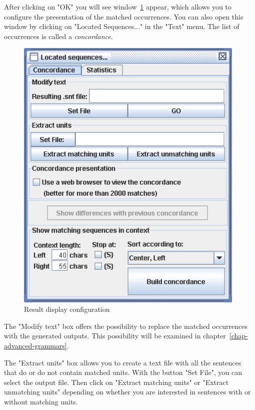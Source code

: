 \noindent After clicking on "OK" you will see
window~\ref{fig-configuration-concordance} appear, which allows you to configure
the presentation of the matched occurrences. You can also open this window by
clicking on "Located Sequences..." in the "Text" menu. The list of
occurrences is called a \textit{concordance}.


\bigskip
\begin{figure}[!ht]
\begin{center}
\includegraphics[width=11cm]{resources/img/fig4-6.png}
\caption{Result display configuration\label{fig-configuration-concordance}}
\end{center}
\end{figure}

\bigskip
\noindent The "Modify text" box offers the possibility to replace the matched
occurrences with the generated outputs. This possibility will be examined in 
chapter~\ref{chap-advanced-grammars}.

\bigskip
\noindent The "Extract units" box allows you to create a text file with all
the sentences that do or do not contain matched units. With the button "Set File",
you can select the output file. Then click on "Extract matching units" or
"Extract unmatching units" depending on whether you are interested in sentences
with or without matching units.

